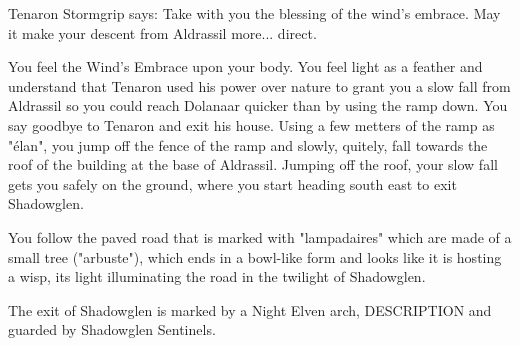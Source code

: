 



Tenaron Stormgrip says: Take with you the blessing of the wind's embrace. May it make your descent from Aldrassil more... direct.

You feel the Wind's Embrace upon your body. You feel light as a feather and understand that Tenaron used his power over nature to grant you a slow fall from Aldrassil so you could reach Dolanaar quicker than by using the ramp down. You say goodbye to Tenaron and exit his house. Using a few metters of the ramp as "élan", you jump off the fence of the ramp and slowly, quitely, fall towards the roof of the building at the base of Aldrassil. %
Jumping off the roof, your slow fall gets you safely on the ground, where you start heading south east to exit Shadowglen. %

You follow the paved road that is marked with "lampadaires" which are made of a small tree ("arbuste"), which ends in a bowl-like form and looks like it is hosting a wisp, its light illuminating the road in the twilight of Shadowglen.

The exit of Shadowglen is marked by a Night Elven arch, DESCRIPTION and guarded by Shadowglen Sentinels.
